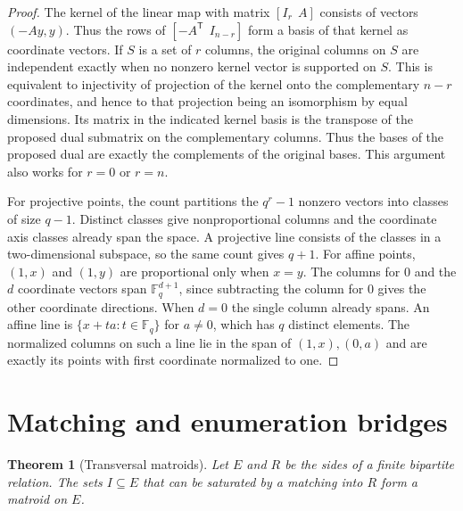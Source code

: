 \documentclass[11pt,oneside,openany]{book}
\theoremstyle{plain}
\newtheorem{theorem}{Theorem}[chapter]
\theoremstyle{definition}
\theoremstyle{remark}
\begin{document}
\begin{proof}
The kernel of the linear map with matrix \([I_r\ \ A]\)
consists of vectors \((-Ay,y)\). Thus the rows of
\([-A^{\mathsf T}\ \ I_{n-r}]\) form a basis of that kernel
as coordinate vectors. If \(S\) is a set of \(r\) columns,
the original columns on \(S\) are independent exactly when
no nonzero kernel vector is supported on \(S\). This is
equivalent to injectivity of projection of the kernel onto
the complementary \(n-r\) coordinates, and hence to that
projection being an isomorphism by equal dimensions. Its
matrix in the indicated kernel basis is the transpose of
the proposed dual submatrix on the complementary columns.
Thus the bases of the proposed dual are exactly the
complements of the original bases. This argument also
works for \(r=0\) or \(r=n\).

For projective points, the count partitions the \(q^r-1\)
nonzero vectors into classes of size \(q-1\). Distinct
classes give nonproportional columns and the coordinate
axis classes already span the space. A projective line
consists of the classes in a two-dimensional subspace,
so the same count gives \(q+1\). For affine points,
\((1,x)\) and \((1,y)\) are proportional only when
\(x=y\). The columns for \(0\) and the \(d\) coordinate
vectors span \(\mathbb F_q^{d+1}\), since subtracting the
column for \(0\) gives the other coordinate directions.
When \(d=0\) the single column already spans. An affine
line is \(\{x+ta:t\in\mathbb F_q\}\) for \(a\ne0\), which
has \(q\) distinct elements. The normalized columns on
such a line lie in the span of \((1,x),(0,a)\) and are
exactly its points with first coordinate normalized to one.
\end{proof}

\section{Matching and enumeration bridges}

\begin{theorem}[Transversal matroids]
\label{p204:W76}
Let \(E\) and \(R\) be the sides of a finite bipartite
relation. The sets \(I\subseteq E\) that can be saturated
by a matching into \(R\) form a matroid on \(E\).
\end{theorem}
\end{document}
